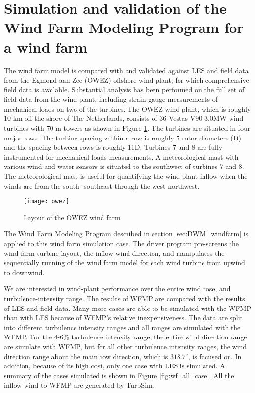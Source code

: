 \documentclass{umthesis}
\begin{document}
\section{Simulation and validation of the Wind Farm Modeling Program for a wind farm}\label{sec:wind_farm_results}
The wind farm model is compared with and validated against LES and field data from the Egmond aan Zee (OWEZ) offshore wind plant, for which comprehensive field data is available. Substantial analysis has been performed on the full set of field data from the wind plant, including strain-gauge measurements of mechanical loads on two of the turbines. The OWEZ wind plant, which is roughly 10 km off the shore of The Netherlands, consists of 36 Vestas
V90-3.0MW wind turbines with 70 m towers as shown in Figure \ref{fig:owez}. The turbines are situated in four
major rows. The turbine spacing within a row is roughly 7 rotor diameters (D) and the spacing between rows is roughly 11D. Turbines 7 and 8 are fully instrumented for mechanical loads measurements. A meteorological mast with various wind and water sensors is situated to the southwest of turbines 7 and 8. The meteorological mast is useful for quantifying the wind plant inflow when the winds are from the south- southeast through the west-northwest.
\begin{figure}
  \centering
  \texttt{[image: owez]}
  \caption{Layout of the OWEZ wind farm}\label{fig:owez}
\end{figure}

The Wind Farm Modeling Program described in section \ref{sec:DWM_windfarm} is applied to this wind farm simulation case. The driver program pre-screens the wind farm turbine layout, the inflow wind direction, and manipulates the sequentially running of the wind farm model for each wind turbine from upwind to downwind. 

We are interested in wind-plant performance over the entire wind rose, and turbulence-intensity range. The results of WFMP are compared with the results of LES and field data. Many more cases are able to be simulated with the WFMP than with LES because of WFMP’s relative inexpensiveness. The data are split into different turbulence intensity ranges and all ranges are simulated with the WFMP. For the 4-6\% turbulence intensity range, the entire wind direction range are simulate with WFMP, but for all other turbulence intensity ranges, the wind direction range about the main row direction, which is $318.7^\circ$, is focused on. In addition, because of its high cost, only one case with LES is simulated. A summary of the cases simulated is shown in Figure \ref{fig:wf_all_case}. All the inflow wind to WFMP are generated by TurbSim.
\end{document}

